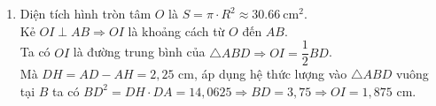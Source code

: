 \begin{bt}
{\begin{enumerate}
	Xét $\triangle ABD$ vuông tại $B$ có $BH$ là đường cao nên\\
	$AB^2 = AH\cdot AD \Rightarrow AD =  \dfrac{AB^2}{AH} = \dfrac{25}{4} = 6{.}25$ (cm).\\
	Suy ra bán kính đường tròn tâm $O$ bằng $R = \dfrac{6{.}25}{2} = 3{.}125$ (cm).\\
	\item Diện tích hình tròn tâm $O$ là $S = \pi\cdot R^2 \approx 30{.}66\ \text{cm}^2$.\\
	Kẻ $OI \perp AB \Rightarrow OI$ là khoảng cách từ $O$ đến $AB$.\\
	Ta có $OI$ là đường trung bình của $\triangle ABD \Rightarrow OI = \dfrac{1}{2}BD$.\\
	Mà $DH = AD - AH = 2{,}25$ cm, áp dụng hệ thức lượng vào $\triangle ABD$ vuông tại $B$ ta có $BD^2 = DH\cdot DA = 14{,}0625 \Rightarrow BD = 3{,}75 \Rightarrow OI = 1{,}875$ cm.
\end{enumerate}
	}
	
\end{bt}


